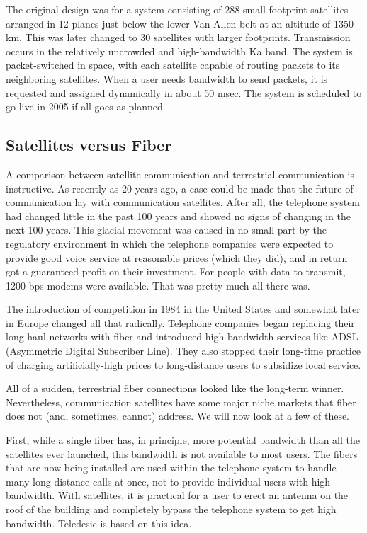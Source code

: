 The original design was for a system consisting of 288 small-footprint
satellites arranged in 12 planes just below the lower Van Allen belt at
an altitude of 1350 km. This was later changed to 30 satellites with
larger footprints. Transmission occurs in the relatively uncrowded and
high-bandwidth Ka band. The system is packet-switched in space, with
each satellite capable of routing packets to its neighboring satellites.
When a user needs bandwidth to send packets, it is requested and
assigned dynamically in about 50 msec. The system is scheduled to go
live in 2005 if all goes as planned.

\protect\hypertarget{0130661023_ch02lev1sec4.htmlux5cux23ch02lev2sec16}{}{}

\subsection{Satellites versus Fiber}

A comparison between satellite communication and terrestrial
communication is instructive. As recently as 20 years ago, a case could
be made that the future of communication lay with communication
satellites. After all, the telephone system had changed little in the
past 100 years and showed no signs of changing in the next 100 years.
This glacial movement was caused in no small part by the regulatory
environment in which the telephone companies were expected to provide
good voice service at reasonable prices (which they did), and in return
got a guaranteed profit on their investment. For people with data to
transmit, 1200-bps modems were available. That was pretty much all there
was.

The introduction of competition in 1984 in the United States and
somewhat later in Europe changed all that radically. Telephone companies
began replacing their long-haul networks with fiber and introduced
high-bandwidth services like ADSL (Asymmetric Digital Subscriber Line).
They also stopped their long-time practice of charging artificially-high
prices to long-distance users to subsidize local service.

All of a sudden, terrestrial fiber connections looked like the long-term
winner. Nevertheless, communication satellites have some major niche
markets that fiber does not (and, sometimes, cannot) address. We will
now look at a few of these.

First, while a single fiber has, in principle, more potential bandwidth
than all the satellites ever launched, this bandwidth is not available
to most users. The fibers that are now being installed are used within
the telephone system to handle many long distance calls at once, not to
provide individual users with high bandwidth. With satellites, it is
practical for a user to erect an antenna on the roof of the building and
completely bypass the telephone system to get high bandwidth. Teledesic
is based on this idea.

